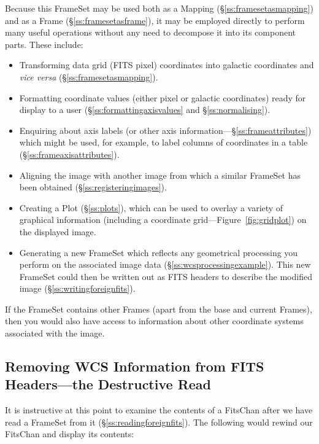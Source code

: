 \documentclass[twoside,11pt]{article}
\newcommand{\secref}[1]{\S\ref{#1}}
\newcommand{\secref}[1]{\ref{#1}}
\begin{document}
Because this FrameSet may be used both as a Mapping
(\secref{ss:framesetasmapping}) and as a Frame
(\secref{ss:framesetasframe}), it may be employed directly to perform
many useful operations without any need to decompose it into its
component parts. These include:

\begin{itemize}
\item Transforming data grid (FITS pixel) coordinates into galactic
coordinates and {\em{vice versa}} (\secref{ss:framesetasmapping}).

\item Formatting coordinate values (either pixel or galactic
coordinates) ready for display to a user
(\secref{ss:formattingaxisvalues} and \secref{ss:normalising}).

\item Enquiring about axis labels (or other axis
information---\secref{ss:frameattributes}) which might be used, for
example, to label columns of coordinates in a table
(\secref{ss:frameaxisattributes}).

\item Aligning the image with another image from which a similar
FrameSet has been obtained (\secref{ss:registeringimages}).

\item Creating a Plot (\secref{ss:plots}), which can be used to overlay
a variety of graphical information (including a coordinate
grid---Figure~\ref{fig:gridplot}) on the displayed image.

\item Generating a new FrameSet which reflects any geometrical
processing you perform on the associated image data
(\secref{ss:wcsprocessingexample}). This new FrameSet could then be
written out as FITS headers to describe the modified image
(\secref{ss:writingforeignfits}).
\end{itemize}

If the FrameSet contains other Frames (apart from the base and current
Frames), then you would also have access to information about other
coordinate systems associated with the image.

\subsection{\label{ss:destructiveread}Removing WCS Information from FITS Headers---the Destructive Read}

It is instructive at this point to examine the contents of a FitsChan
after we have read a FrameSet from it
(\secref{ss:readingforeignfits}). The following would rewind our
FitsChan and display its contents:
\end{document}
